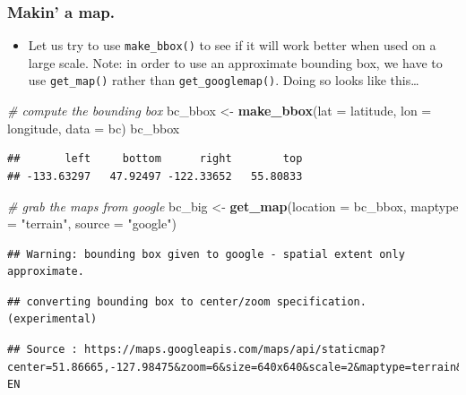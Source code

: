 \documentclass[]{book}
\newenvironment{Shaded}{\begin{snugshade}}{\end{snugshade}}
\newcommand{\KeywordTok}[1]{\textcolor[rgb]{0.13,0.29,0.53}{\textbf{{#1}}}}
\newcommand{\DataTypeTok}[1]{\textcolor[rgb]{0.13,0.29,0.53}{{#1}}}
\newcommand{\StringTok}[1]{\textcolor[rgb]{0.31,0.60,0.02}{{#1}}}
\newcommand{\CommentTok}[1]{\textcolor[rgb]{0.56,0.35,0.01}{\textit{{#1}}}}
\newcommand{\NormalTok}[1]{{#1}}
\providecommand{\tightlist}{%
  \setlength{\itemsep}{0pt}\setlength{\parskip}{0pt}}
\theoremstyle{definition}
\theoremstyle{definition}
\theoremstyle{remark}
\begin{document}
\subsubsection{Makin' a map.}\label{makin-a-map.}

\begin{itemize}
\tightlist
\item
  Let us try to use \texttt{make\_bbox()} to see if it will work better
  when used on a large scale. Note: in order to use an approximate
  bounding box, we have to use \texttt{get\_map()} rather than
  \texttt{get\_googlemap()}. Doing so looks like this\ldots{}
\end{itemize}

\begin{Shaded}
\begin{Highlighting}[]
\CommentTok{# compute the bounding box}
\NormalTok{bc_bbox <-}\StringTok{ }\KeywordTok{make_bbox}\NormalTok{(}\DataTypeTok{lat =} \NormalTok{latitude, }\DataTypeTok{lon =} \NormalTok{longitude, }\DataTypeTok{data =} \NormalTok{bc)}
\NormalTok{bc_bbox}
\end{Highlighting}
\end{Shaded}

\begin{verbatim}
##       left     bottom      right        top 
## -133.63297   47.92497 -122.33652   55.80833
\end{verbatim}

\begin{Shaded}
\begin{Highlighting}[]
\CommentTok{# grab the maps from google}
\NormalTok{bc_big <-}\StringTok{ }\KeywordTok{get_map}\NormalTok{(}\DataTypeTok{location =} \NormalTok{bc_bbox, }\DataTypeTok{maptype =} \StringTok{"terrain"}\NormalTok{, }\DataTypeTok{source =} \StringTok{"google"}\NormalTok{)}
\end{Highlighting}
\end{Shaded}

\begin{verbatim}
## Warning: bounding box given to google - spatial extent only approximate.
\end{verbatim}

\begin{verbatim}
## converting bounding box to center/zoom specification. (experimental)
\end{verbatim}

\begin{verbatim}
## Source : https://maps.googleapis.com/maps/api/staticmap?center=51.86665,-127.98475&zoom=6&size=640x640&scale=2&maptype=terrain&language=en-EN
\end{verbatim}
\end{document}
